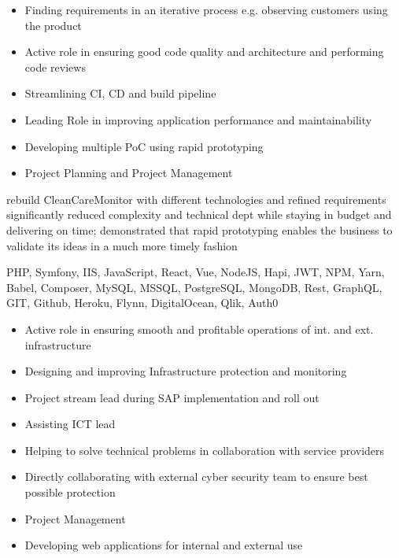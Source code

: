 \documentclass[9pt,a4paper]{altacv}
\begin{document}
\divider

%

\begin{itemize}
\item Finding requirements in an iterative process e.g. observing customers using the product
\item Active role in ensuring good code quality and architecture and performing code reviews
\item Streamlining CI, CD and build pipeline
\item Leading Role in improving application performance and maintainability
\item Developing multiple PoC using rapid prototyping
\item Project Planning and Project Management

\end{itemize}

rebuild CleanCareMonitor with different technologies and refined requirements significantly reduced complexity and technical dept while staying in budget and delivering on time;
demonstrated that rapid prototyping enables the business to validate its ideas in a much more timely fashion

PHP, Symfony, IIS,
JavaScript, React, Vue, NodeJS, Hapi, JWT, NPM, Yarn, Babel, Composer,
MySQL, MSSQL, PostgreSQL, MongoDB, Rest, GraphQL,
GIT, Github, Heroku, Flynn, DigitalOcean, Qlik, Auth0

\divider

%

\begin{itemize}
\item Active role in ensuring smooth and profitable operations of int. and ext. infrastructure
\item Designing and improving Infrastructure protection and monitoring
\item Project stream lead during SAP implementation and roll out
\item Assisting ICT lead
\item Helping to solve technical problems in collaboration with service providers
\item Directly collaborating with external cyber security team to ensure best possible protection
\item Project Management
\item Developing web applications for internal and external use

\end{itemize}
\end{document}
